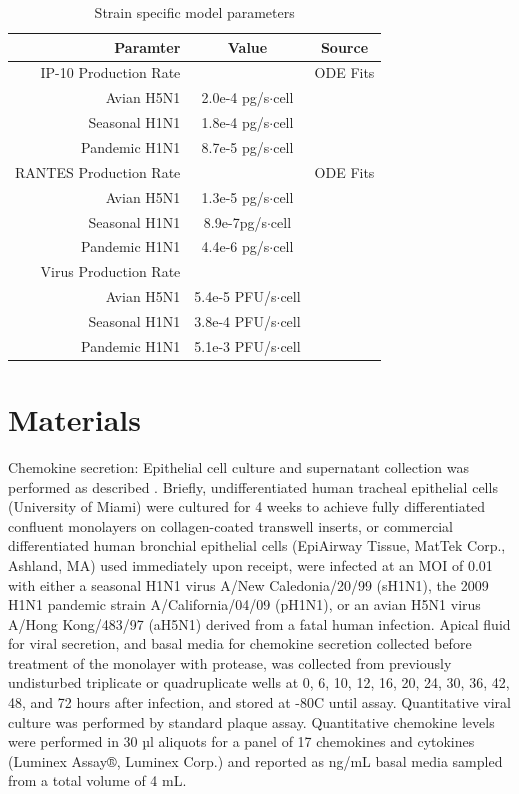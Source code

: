 \documentclass[10pt]{article}
\begin{document}
\begin{table}
\begin{center}
\begin{tabular}{ | r | c | c | }
  \hline                        
  Paramter & Value & Source \\
  \hline
  IP-10 Production Rate &  & ODE Fits \\
  Avian H5N1 & 2.0e-4 pg/s$\cdot$cell & \\
  Seasonal H1N1 & 1.8e-4 pg/s$\cdot$cell& \\
  Pandemic H1N1 & 8.7e-5 pg/s$\cdot$cell& \\
  \hline
  RANTES Production Rate & & ODE Fits \\
  Avian H5N1 & 1.3e-5 pg/s$\cdot$cell& \\
  Seasonal H1N1 & 8.9e-7pg/s$\cdot$cell& \\
  Pandemic H1N1 & 4.4e-6 pg/s$\cdot$cell& \\
  \hline
  Virus Production Rate &  & \cite{Mitchell2011} \\
  Avian H5N1 & 5.4e-5 PFU/s$\cdot$cell& \\
  Seasonal H1N1 & 3.8e-4 PFU/s$\cdot$cell& \\
  Pandemic H1N1 & 5.1e-3 PFU/s$\cdot$cell& \\  
  \hline  
\end{tabular}
\caption{Strain specific model parameters}
\label{table:strains}
\end{center}
\end{table}

\section*{Materials}

Chemokine secretion:  Epithelial cell culture and supernatant collection was performed as described \cite{Mitchell2011}.  Briefly, undifferentiated human tracheal epithelial cells (University of Miami) were cultured for 4 weeks to achieve fully differentiated confluent monolayers on collagen-coated transwell inserts, or commercial differentiated human bronchial epithelial cells (EpiAirway Tissue, MatTek Corp., Ashland, MA) used immediately upon receipt, were infected at an MOI of 0.01 with either a seasonal H1N1 virus A/New Caledonia/20/99 (sH1N1), the 2009 H1N1 pandemic strain A/California/04/09 (pH1N1), or an avian H5N1 virus A/Hong Kong/483/97 (aH5N1) derived from a fatal human infection.  Apical fluid for viral secretion, and basal media for chemokine secretion collected before treatment of the monolayer with protease, was collected from previously undisturbed triplicate or quadruplicate wells at 0, 6, 10, 12, 16, 20, 24, 30, 36, 42, 48, and 72 hours after infection, and stored at -80C until assay.  Quantitative viral culture was performed by standard plaque assay.  Quantitative chemokine levels were performed in 30 µl aliquots for a panel of 17 chemokines and cytokines (Luminex Assay®, Luminex Corp.) and reported as ng/mL basal media sampled from a total volume of 4 mL.
\end{document}
